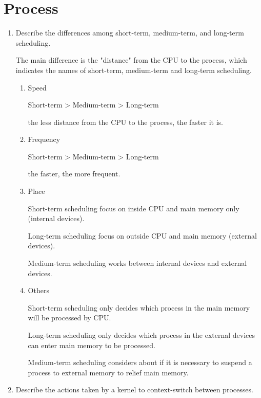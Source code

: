 \chapter{Process}

\begin{enumerate}
    \item Describe the differences among short-term, medium-term, and long-term scheduling.

    The main difference is the "distance" from the CPU to the process, which indicates the names of short-term, medium-term and long-term scheduling.
    
    \begin{enumerate}
        \item Speed
    
        Short-term > Medium-term > Long-term
        
        the less distance from the CPU to the process, the faster it is.
        
        \item Frequency
        
        Short-term > Medium-term > Long-term
        
        the faster, the more frequent.
        
        \item Place
        
        Short-term scheduling focus on inside CPU and main memory only (internal devices).
        
        Long-term scheduling focus on outside CPU and main memory (external devices).
        
        Medium-term scheduling works between internal devices and external devices.
        
        \item Others
        
        Short-term scheduling only decides which process in the main memory will be processed by CPU.
        
        Long-term scheduling only decides which process in the external devices can enter main memory to be processed.
        
        Medium-term scheduling considers about if it is necessary to suspend a process to external memory to relief main memory.
        
    \end{enumerate}
    
    \item Describe the actions taken by a kernel to context-switch between processes. 
    

\end{enumerate}
